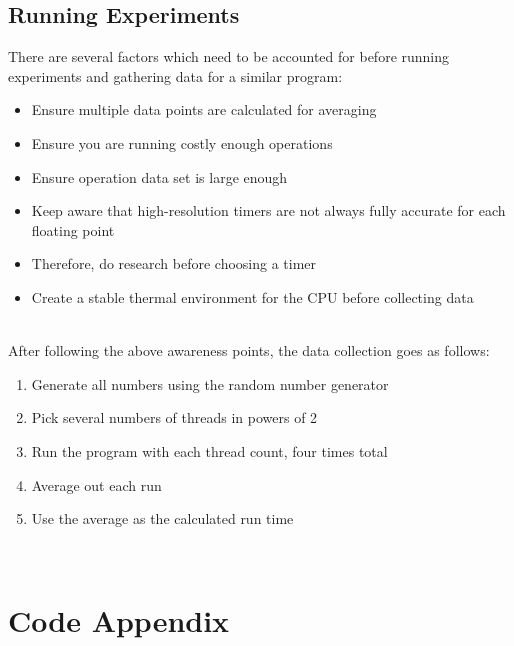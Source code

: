 \documentclass[fleqn,10pt]{wlscirep}
\begin{document}
\subsection*{Running Experiments}
There are several factors which need to be accounted for before running experiments and gathering data for a similar program:
\\
\begin{itemize}
  \item Ensure multiple data points are calculated for averaging
  \item Ensure you are running costly enough operations
  \item Ensure operation data set is large enough 
  \item Keep aware that high-resolution timers are not always fully accurate for each floating point
  \item Therefore, do research before choosing a timer
  \item Create a stable thermal environment for the CPU before collecting data
\end{itemize}
\\
After following the above awareness points, the data collection goes as follows:
\\
\begin{enumerate}
  \item Generate all numbers using the random number generator
  \item Pick several numbers of threads in powers of 2
  \item Run the program with each thread count, four times total
  \item Average out each run
  \item Use the average as the calculated run time
\end{enumerate}
\\




\pagebreak
\section{Code Appendix}


\pagebreak

\end{document}
